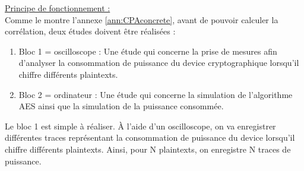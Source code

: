 \documentclass[oneside]{book}
\begin{document}
\underline{Principe de fonctionnement :} \vspace{0.4 cm}\\
Comme le montre l'annexe \ref{ann:CPAconcrete}, avant de pouvoir calculer la corrélation, deux études doivent être réalisées : 
\begin{enumerate}
\item Bloc 1 = oscilloscope : Une étude qui concerne la prise de mesures afin d'analyser la consommation de puissance du device cryptographique lorsqu'il chiffre différents plaintexts.
\item Bloc 2 = ordinateur : Une étude qui concerne la simulation de l'algorithme AES ainsi que la simulation de la puissance consommée.
\end{enumerate}

\hspace{-0.5 cm}Le bloc 1 est simple à réaliser. À l'aide d'un oscilloscope, on va enregistrer différentes traces représentant la consommation de puissance du device lorsqu'il chiffre différents plaintexts. Ainsi, pour N plaintexts, on enregistre N traces de puissance.
 
\end{document}

